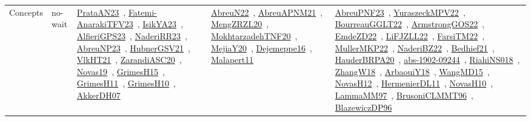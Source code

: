 {\begin{longtable}{lp{3cm}>{\raggedright\arraybackslash}p{6cm}>{\raggedright\arraybackslash}p{6cm}>{\raggedright\arraybackslash}p{8cm}}
Concepts & no-wait & \href{../works/PrataAN23.pdf}{PrataAN23}~\cite{PrataAN23}, \href{../works/Fatemi-AnarakiTFV23.pdf}{Fatemi-AnarakiTFV23}~\cite{Fatemi-AnarakiTFV23}, \href{../works/IsikYA23.pdf}{IsikYA23}~\cite{IsikYA23}, \href{../works/AlfieriGPS23.pdf}{AlfieriGPS23}~\cite{AlfieriGPS23}, \href{../works/NaderiRR23.pdf}{NaderiRR23}~\cite{NaderiRR23}, \href{../works/AbreuNP23.pdf}{AbreuNP23}~\cite{AbreuNP23}, \href{../works/HubnerGSV21.pdf}{HubnerGSV21}~\cite{HubnerGSV21}, \href{../works/VlkHT21.pdf}{VlkHT21}~\cite{VlkHT21}, \href{../works/ZarandiASC20.pdf}{ZarandiASC20}~\cite{ZarandiASC20}, \href{../works/Novas19.pdf}{Novas19}~\cite{Novas19}, \href{../works/GrimesH15.pdf}{GrimesH15}~\cite{GrimesH15}, \href{../works/GrimesH11.pdf}{GrimesH11}~\cite{GrimesH11}, \href{../works/GrimesH10.pdf}{GrimesH10}~\cite{GrimesH10}, \href{../works/AkkerDH07.pdf}{AkkerDH07}~\cite{AkkerDH07} & \href{../works/AbreuN22.pdf}{AbreuN22}~\cite{AbreuN22}, \href{../works/AbreuAPNM21.pdf}{AbreuAPNM21}~\cite{AbreuAPNM21}, \href{../works/MengZRZL20.pdf}{MengZRZL20}~\cite{MengZRZL20}, \href{../works/MokhtarzadehTNF20.pdf}{MokhtarzadehTNF20}~\cite{MokhtarzadehTNF20}, \href{../works/MejiaY20.pdf}{MejiaY20}~\cite{MejiaY20}, \href{../works/Dejemeppe16.pdf}{Dejemeppe16}~\cite{Dejemeppe16}, \href{../works/Malapert11.pdf}{Malapert11}~\cite{Malapert11} & \href{../works/AbreuPNF23.pdf}{AbreuPNF23}~\cite{AbreuPNF23}, \href{../works/YuraszeckMPV22.pdf}{YuraszeckMPV22}~\cite{YuraszeckMPV22}, \href{../works/BourreauGGLT22.pdf}{BourreauGGLT22}~\cite{BourreauGGLT22}, \href{../works/ArmstrongGOS22.pdf}{ArmstrongGOS22}~\cite{ArmstrongGOS22}, \href{../works/EmdeZD22.pdf}{EmdeZD22}~\cite{EmdeZD22}, \href{../works/LiFJZLL22.pdf}{LiFJZLL22}~\cite{LiFJZLL22}, \href{../works/FarsiTM22.pdf}{FarsiTM22}~\cite{FarsiTM22}, \href{../works/MullerMKP22.pdf}{MullerMKP22}~\cite{MullerMKP22}, \href{../works/NaderiBZ22.pdf}{NaderiBZ22}~\cite{NaderiBZ22}, \href{../works/Bedhief21.pdf}{Bedhief21}~\cite{Bedhief21}, \href{../works/HauderBRPA20.pdf}{HauderBRPA20}~\cite{HauderBRPA20}, \href{../works/abs-1902-09244.pdf}{abs-1902-09244}~\cite{abs-1902-09244}, \href{../works/RiahiNS018.pdf}{RiahiNS018}~\cite{RiahiNS018}, \href{../works/ZhangW18.pdf}{ZhangW18}~\cite{ZhangW18}, \href{../works/ArbaouiY18.pdf}{ArbaouiY18}~\cite{ArbaouiY18}, \href{../works/WangMD15.pdf}{WangMD15}~\cite{WangMD15}, \href{../works/NovasH12.pdf}{NovasH12}~\cite{NovasH12}, \href{../works/HermenierDL11.pdf}{HermenierDL11}~\cite{HermenierDL11}, \href{../works/NovasH10.pdf}{NovasH10}~\cite{NovasH10}, \href{../works/LammaMM97.pdf}{LammaMM97}~\cite{LammaMM97}, \href{../works/BrusoniCLMMT96.pdf}{BrusoniCLMMT96}~\cite{BrusoniCLMMT96}, \href{../works/BlazewiczDP96.pdf}{BlazewiczDP96}~\cite{BlazewiczDP96}\\

\end{longtable}}

